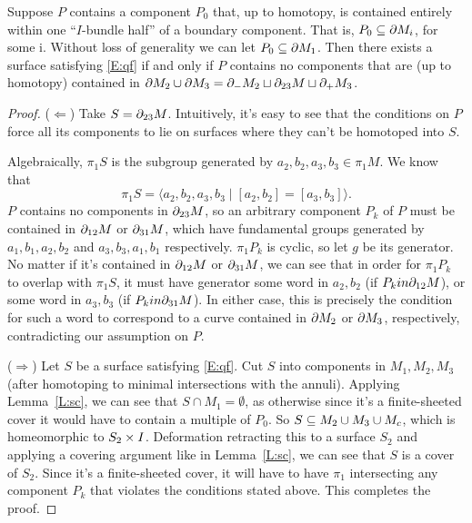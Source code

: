 \begin{prop}

Suppose $P$ contains a component $P_0$ that, up to homotopy, is contained
entirely within one ``$I$-bundle half'' of a boundary component. That is, $P_0
\subseteq \partial M_i$, for some i. Without loss of generality we can let $P_0 \subseteq \partial
M_1$.  Then there exists a surface satisfying \eqref{E:qf} if and only if $P$
contains no components that are (up to homotopy) contained in $\partial M_2 \cup \partial
M_3 = \partial_-M_2 \sqcup \partial_{23}M \sqcup \partial_+M_3$.

\end{prop}
\begin{proof}

($\Longleftarrow$) Take $S=\partial_{23}M$. Intuitively, it's easy to see that the
conditions on $P$ force all its components to lie on surfaces where they can't
be homotoped into $S$.

Algebraically, $\pi_1S$ is the subgroup generated by $a_2,b_2,a_3,b_3 \in
\pi_1M$. We know that
\[
\pi_1S = \langle a_2,b_2,a_3,b_3 \mid [a_2,b_2]=[a_3,b_3]\rangle.
\]
$P$ contains no components in $\partial_{23}M$, so an arbitrary component $P_k$ of
$P$ must be contained in $\partial_{12}M$ or $\partial_{31}M$, which have fundamental
groups generated by $a_1,b_1,a_2,b_2$ and $a_3,b_3,a_1,b_1$ respectively.
$\pi_1P_k$ is cyclic, so let $g$ be its generator. No matter if it's contained
in $\partial_{12}M$ or $\partial_{31}M$, we can see that in order for $\pi_1P_k$ to
overlap with $\pi_1S$, it must have generator some word in $a_2,b_2$ (if $P_k
in \partial_{12}M$), or some word in $a_3,b_3$ (if $P_k in \partial_{31}M$). In either
case, this is precisely the condition for such a word to correspond to a curve
contained in $\partial M_2$ or $\partial M_3$, respectively, contradicting our assumption
on $P$.

($\Longrightarrow$) Let $S$ be a surface satisfying \eqref{E:qf}. Cut $S$ into
components in $M_1,M_2,M_3$ (after homotoping to minimal intersections with the
annuli).  Applying Lemma~\ref{L:sc}, we can see that $S \cap M_1 = \emptyset$,
as otherwise since it's a finite-sheeted cover it would have to contain
a multiple of $P_0$.  So $S \subseteq M_2 \cup M_3 \cup M_c$, which is homeomorphic
to $S_2 \times I$.  Deformation retracting this to a surface $S_2$ and applying
a covering argument like in Lemma~\ref{L:sc}, we can see that $S$ is a cover of
$S_2$.  Since it's a finite-sheeted cover, it will have to have $\pi_1$
intersecting any component $P_k$ that violates the conditions stated above.
This completes the proof.

\end{proof}

